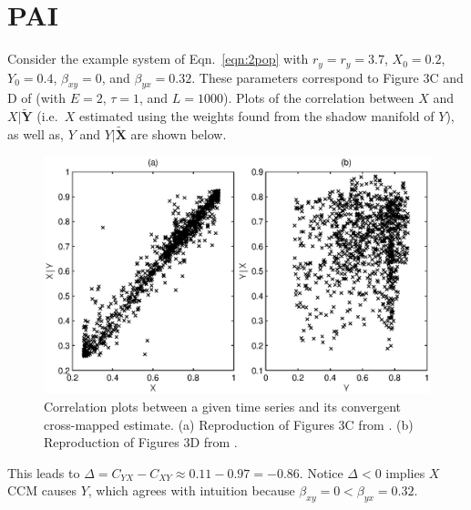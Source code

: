 \documentclass[twocolumn,aps,pre,groupedaddress]{revtex4-1}
\begin{document}
\section{PAI}
\label{sec:PAI}
Consider the example system of Eqn.\ \ref{eqn:2pop} with $r_y=r_y=3.7$, $X_0 = 0.2$, $Y_0=0.4$, $\beta_{xy}=0$, and $\beta_{yx}=0.32$.  These parameters correspond to Figure 3C and D of \cite{Sugihara2012} (with $E=2$, $\tau=1$, and $L=1000$).  Plots of the correlation between $X$ and $X|\tilde{\mathbf{Y}}$ (i.e.\ $X$ estimated using the weights found from the shadow manifold of $Y$), as well as, $Y$ and $Y|\tilde{\mathbf{X}}$ are shown below.
\begin{figure}[ht]
\includegraphics[scale=0.55]{SugFig3CD.eps} 
\caption{Correlation plots between a given time series and its convergent cross-mapped estimate.  (a) Reproduction of Figures 3C from \cite{Sugihara2012}. (b) Reproduction of Figures 3D from \cite{Sugihara2012}.}
\label{fig:Sug3CDredo}
\end{figure}
This leads to $\Delta=C_{YX}-C_{XY}\approx 0.11 - 0.97 = -0.86$.  Notice $\Delta<0$ implies $X$ CCM causes $Y$, which agrees with intuition because $\beta_{xy}=0 < \beta_{yx} = 0.32$.
\end{document}
